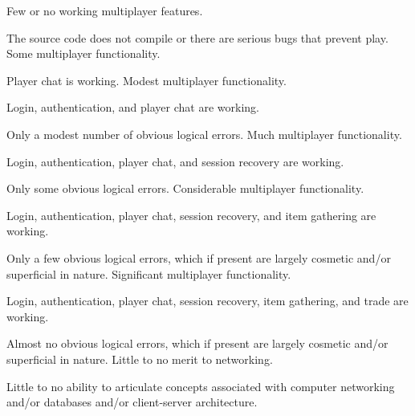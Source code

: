 \documentclass{../../fal_assignment}
\begin{document}
\begin{markingrubric}
%
%
        \grade\fail 	Few or no working multiplayer features.
            \par 		The source code does not compile or there are serious bugs that prevent play.
        \grade 		Some multiplayer functionality.
        \par 		Player chat is working.
        \grade 		Modest multiplayer functionality.
            \par		Login, authentication, and player chat are working.
            \par 		Only a modest number of obvious logical errors. 
        \grade 		Much multiplayer functionality.
            \par		Login, authentication, player chat, and session recovery are working.
            \par 		Only some obvious logical errors. 
        \grade 		Considerable multiplayer functionality.
            \par		Login, authentication, player chat, session recovery, and item gathering are working.
            \par 		Only a few obvious logical errors, which if present are largely cosmetic and/or superficial in nature.
        \grade 		Significant multiplayer functionality.
            \par		Login, authentication, player chat, session recovery, item gathering, and trade are working.
            \par 		Almost no obvious logical errors, which if present are largely cosmetic and/or superficial in nature.
%
        \grade\fail Little to no merit to networking.
            \par Little to no ability to articulate concepts associated with computer networking and/or databases and/or client-server architecture.

\end{markingrubric}
\end{document}

